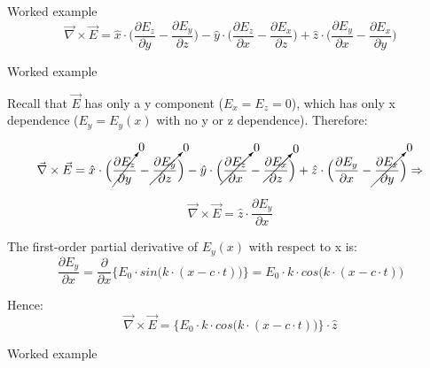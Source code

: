 {\begin{frame}{Worked example}
\begin{equation*}
   \vec{\nabla} \times \vec{E} =
   \hat{x} \cdot \Big( \frac{\partial E_{z}}{\partial y} - \frac{\partial E_{y}}{\partial z} \Big) -
   \hat{y} \cdot \Big( \frac{\partial E_{z}}{\partial x} - \frac{\partial E_{x}}{\partial z} \Big) +
   \hat{z} \cdot \Big( \frac{\partial E_{y}}{\partial x} - \frac{\partial E_{x}}{\partial y} \Big)
\end{equation*}

\end{frame}

%
%
%
%

\begin{frame}{Worked example}

Recall that $\vec{E}$ has only a y component ($E_{x} = E_{z} = 0$),
which has only x dependence ($E_{y} = E_{y}(x)$ with no y or z dependence).
Therefore:

\begin{equation*}
  \vec{\nabla} \times \vec{E} =
   \hat{x} \cdot \Big( \cancelto{0}{\frac{\partial E_{z}}{\partial y}} - \cancelto{0}{\frac{\partial E_{y}}{\partial z}} \Big) -
   \hat{y} \cdot \Big( \cancelto{0}{\frac{\partial E_{z}}{\partial x}} - \cancelto{0}{\frac{\partial E_{x}}{\partial z}} \Big) +
   \hat{z} \cdot \Big( \frac{\partial E_{y}}{\partial x} - \cancelto{0}{\frac{\partial E_{x}}{\partial y}} \Big) \Rightarrow
\end{equation*}

\begin{equation*}
  \vec{\nabla} \times \vec{E} = \hat{z} \cdot\frac{\partial E_{y}}{\partial x}
\end{equation*}

The first-order partial derivative of $E_{y}(x)$ with respect to x is:
\begin{equation*}
  \frac{\partial E_{y}}{\partial x} =
      \frac{\partial}{\partial x} \bigg\{ E_{0} \cdot sin\Big(k \cdot (x-c \cdot t)\Big) \bigg\} =
      E_{0} \cdot k \cdot cos\Big(k \cdot (x-c \cdot t)\Big)
\end{equation*}

Hence:
\begin{equation*}
  \vec{\nabla} \times \vec{E} = \bigg\{  E_{0} \cdot k \cdot cos\Big(k \cdot (x-c \cdot t)\Big) \bigg\} \cdot \hat{z}
\end{equation*}

\end{frame}

%
%
%
%

\begin{frame}{Worked example}


\end{frame}}
